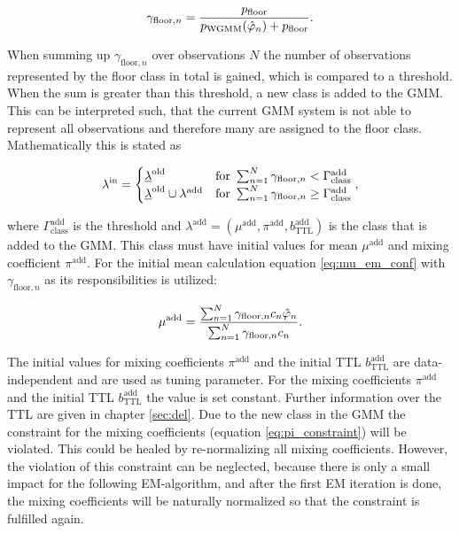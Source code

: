 \begin{equation}
\gamma_{\text{floor},n} = \frac{p_\text{floor}}{p_\text{WGMM}(\hat{\varphi}_n)+p_\text{floor}}.
\end{equation}

When summing up $\gamma_{\text{floor},n}$ over observations $N$
the number of observations represented by the floor class in total is gained, which is compared to a threshold. When the sum is greater than this threshold, a new class is added to the \ac{GMM}. This can be interpreted such, that the current \ac{GMM} system is not able to represent all observations and therefore many are assigned to the floor class.  Mathematically this is stated as

\begin{equation}
\lambda^\text{in} =
	\begin{cases}
	     \underline{\lambda}^{\text{old}} 		  				& \text{for } \sum_{n=1}^N \gamma_{\text{floor},n} < \Gamma_\text{class}^\text{add}\\
	     \underline{\lambda}^{ \text{old}}\cup \lambda^\text{add}	& \text{for } \sum_{n=1}^N \gamma_{\text{floor},n} \geq \Gamma_\text{class}^\text{add}\\
	\end{cases},
\end{equation}


where $\Gamma_\text{class}^\text{add}$ is the threshold and $\lambda^\text{add} = (\mu^\text{add},\pi^\text{add}, b_{\text{TTL}}^\text{add})$ is the class that is added to the \ac{GMM}. This class must have initial values for mean $\mu^\text{add}$ and mixing coefficient $\pi^\text{add}$. For the initial mean calculation equation \ref{eq:mu_em_conf} with $\gamma_{\text{floor},n}$ as its responsibilities is utilized:

\begin{equation}
\mu^\text{add} = \frac{\sum^N_{n=1}\gamma_{\text{floor,}n}c_n \hat{\varphi}_n}{\sum^N_{n=1}\gamma_{\text{floor,}n}c_n}.
\end{equation}

The initial values for mixing coefficients $\pi^\text{add}$ and the initial \ac{TTL} $b_{\text{TTL}}^\text{add}$ are data-independent and are used as tuning parameter.
For the mixing coefficients $\pi^\text{add}$ and the initial \ac{TTL} $b_{\text{TTL}}^\text{add}$ the value is set constant. Further information over the \ac{TTL} are given in chapter \ref{sec:del}. Due to the new class in the \ac{GMM} the constraint for the mixing coefficients (equation \ref{eq:pi_constraint}) will be violated. This could be healed by re-normalizing all mixing coefficients. However, the violation of this constraint can be neglected, because there is only a small impact for the following \ac{EM}-algorithm, and after the first \ac{EM} iteration is done, the mixing coefficients will be naturally normalized so that the constraint is fulfilled again.

